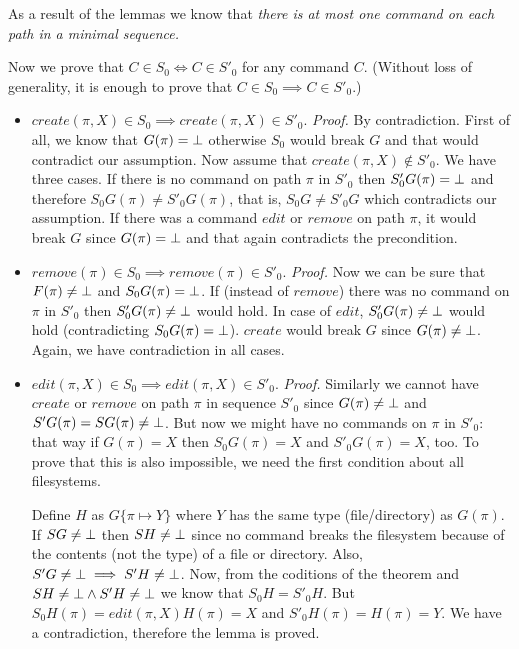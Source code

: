 \label{theorem:conc}

As a result of the lemmas we know that
\emph{there is at most one command on each path in a minimal sequence.}

Now we prove that \(C\in S_0\Longleftrightarrow C\in S'_0\) for any
command \(C\). (Without loss of generality, it is enough to prove that 
\(C\in S_0\implies C\in S'_0\).)
\begin{itemize}
\item \(create(\pi,X)\in S_0\implies create(\pi,X)\in S'_0\). 
\emph{Proof.} By contradiction. First of all, we know that
\(G(\pi)=\bot\) otherwise \(S_0\) would break \(G\) and that would
contradict our assumption. Now assume that 
\(create(\pi,X)\not\in S'_0\). 
We have three cases. If there is no command on path \(\pi\) in
\(S'_0\) then \(S'_0G(\pi)=\bot\) and therefore 
\(S_0G(\pi)\ne S'_0G(\pi)\), that is, \(S_0G\ne S'_0G\) which contradicts
our assumption. If there was a command \(edit\) or
\(remove\) on path \(\pi\), it would break \(G\) since \(G(\pi)=\bot\) and
that again contradicts the precondition.

\item \(remove(\pi)\in S_0\implies remove(\pi)\in S'_0\).
\emph{Proof.} 
Now we can be sure that \(F(\pi)\ne\bot\) and
\(S_0G(\pi)=\bot\). If (instead of
\(remove\)) there was no command on \(\pi\) in \(S'_0\) then 
\(S'_0G(\pi)\ne\bot\)  would hold. In case of \(edit\), 
\(S'_0G(\pi)\ne\bot\) would hold (contradicting
\(S_0G(\pi)=\bot\)). \(create\) would break \(G\) since
\(G(\pi)\ne\bot\). Again, we have contradiction in all cases.

\item \(edit(\pi,X)\in S_0\implies edit(\pi,X)\in S'_0\).
\emph{Proof.} Similarly we cannot have \(create\) or \(remove\) on path
\(\pi\) in sequence \(S'_0\) since \(G(\pi)\ne\bot\) and 
\(S'G(\pi)=SG(\pi)\ne\bot\). 
But now we might have no commands on
\(\pi\) in \(S'_0\): that way if \(G(\pi)=X\) then \(S_0G(\pi)=X\) and
\(S'_0G(\pi)=X\), too. 
To prove that this is also
impossible, we need the first condition about all filesystems. 

Define
\(H\) as \(G\{\pi\mapsto Y\}\) where \(Y\) has the same type
(file/directory) as \(G(\pi)\). If \(SG\ne\bot\) then \(SH\ne\bot\) since no
command breaks the filesystem because of the contents (not the type) of a
file or directory. Also, \(S'G\ne\bot\implies S'H\ne\bot\). Now, 
from the coditions of the theorem
and \(SH\ne\bot\wedge S'H\ne\bot\) we know
that \(S_0H=S'_0H\). But \(S_0H(\pi)=edit(\pi,X)H(\pi)=X\) and
\(S'_0H(\pi)=H(\pi)=Y\). We have a contradiction, therefore the lemma is
proved.
\end{itemize}

